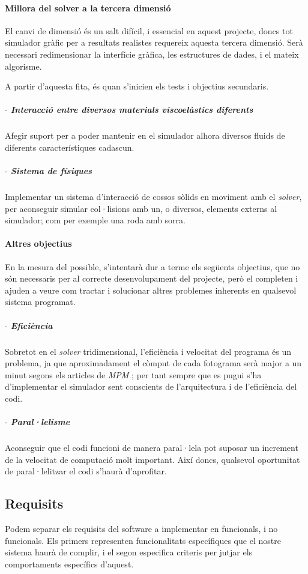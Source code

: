 \documentclass[a4paper]{report}
\begin{document}
	\paragraph{\quad Millora del solver a la tercera dimensió} El canvi de dimensió és un salt difícil, i essencial en aquest projecte, doncs tot simulador gràfic per a resultats realistes requereix aquesta tercera dimensió. Serà necessari redimensionar la interfície gràfica, les estructures de dades, i el mateix algorisme.
	\par
	A partir d'aquesta fita, és quan s'inicien els tests i objectius secundaris.
	\subparagraph[Interacció viscoelàstica]{\qquad $\cdot$ Interacció entre diversos materials viscoelàstics diferents} Afegir suport per a poder mantenir en el simulador alhora diversos fluids de diferents característiques cadascun.
	\subparagraph[Sistema de físiques]{\qquad $\cdot$ Sistema de físiques} Implementar un sistema d'interacció de cossos sòlids en moviment amb el \textit{solver}, per aconseguir simular col·lisions amb un, o diversos, elements externs al simulador; com per exemple una roda amb sorra.
	\paragraph{\quad Altres objectius} En la mesura del possible, s'intentarà dur a terme els següents objectius, que no són necessaris per al correcte desenvolupament del projecte, però el completen i ajuden a veure com tractar i solucionar altres problemes inherents en qualsevol sistema programat.
	\subparagraph[Eficiència]{\qquad $\cdot$ Eficiència} Sobretot en el \textit{solver} tridimensional, l'eficiència i velocitat del programa és un problema, ja que aproximadament el còmput de cada fotograma serà major a un minut segons els articles de \textit{MPM} \cite{hu2018mlsmpmcpic}; per tant sempre que es pugui s'ha d'implementar el simulador sent conscients de l'arquitectura i de l'eficiència del codi.
	\subparagraph[Paral·lelisme]{\qquad $\cdot$ Paral·lelisme} Aconseguir que el codi funcioni de manera paral·lela pot suposar un increment de la velocitat de computació molt important. Així doncs, qualsevol oportunitat de paral·lelitzar el codi s'haurà d'aprofitar.
	
	
	\subsection{Requisits}
	Podem separar els requisits del software a implementar en funcionals, i no funcionals. Els primers representen funcionalitats específiques que el nostre sistema haurà de complir, i el segon especifica criteris per jutjar els comportaments específics d'aquest.
	
\end{document}
